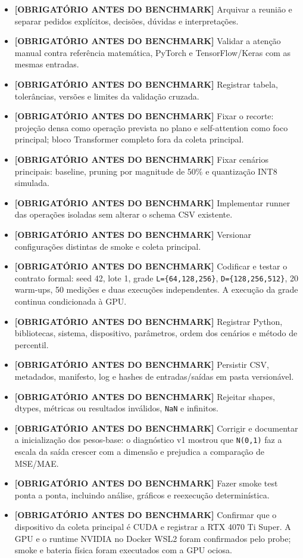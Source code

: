 \begin{itemize}
\item \textbf{[OBRIGATÓRIO ANTES DO BENCHMARK]} Arquivar a reunião e separar pedidos
explícitos, decisões, dúvidas e interpretações.
\item \textbf{[OBRIGATÓRIO ANTES DO BENCHMARK]} Validar a atenção manual contra
referência matemática, PyTorch e TensorFlow/Keras com as mesmas entradas.
\item \textbf{[OBRIGATÓRIO ANTES DO BENCHMARK]} Registrar tabela, tolerâncias,
versões e limites da validação cruzada.
\item \textbf{[OBRIGATÓRIO ANTES DO BENCHMARK]} Fixar o recorte: projeção densa como
operação prevista no plano e self-attention como foco principal; bloco
Transformer completo fora da coleta principal.
\item \textbf{[OBRIGATÓRIO ANTES DO BENCHMARK]} Fixar cenários principais: baseline,
pruning por magnitude de 50\% e quantização INT8 simulada.
\item \textbf{[OBRIGATÓRIO ANTES DO BENCHMARK]} Implementar runner das operações
isoladas sem alterar o schema CSV existente.
\item \textbf{[OBRIGATÓRIO ANTES DO BENCHMARK]} Versionar configurações distintas de
smoke e coleta principal.
\item \textbf{[OBRIGATÓRIO ANTES DO BENCHMARK]} Codificar e testar o contrato formal:
seed 42,
lote 1, grade \texttt{L=\{64,128,256\}}, \texttt{D=\{128,256,512\}}, 20 warm-ups, 50 medições e
duas execuções independentes. A execução da grade continua condicionada à GPU.
\item \textbf{[OBRIGATÓRIO ANTES DO BENCHMARK]} Registrar Python, bibliotecas,
sistema, dispositivo, parâmetros, ordem dos cenários e método de percentil.
\item \textbf{[OBRIGATÓRIO ANTES DO BENCHMARK]} Persistir CSV, metadados, manifesto,
log e hashes de entradas/saídas em pasta versionável.
\item \textbf{[OBRIGATÓRIO ANTES DO BENCHMARK]} Rejeitar shapes, dtypes, métricas ou
resultados inválidos, \texttt{NaN} e infinitos.
\item \textbf{[OBRIGATÓRIO ANTES DO BENCHMARK]} Corrigir e documentar a inicialização
dos pesos-base: o diagnóstico v1 mostrou que \texttt{N(0,1)} faz a escala da saída
crescer com a dimensão e prejudica a comparação de MSE/MAE.
\item \textbf{[OBRIGATÓRIO ANTES DO BENCHMARK]} Fazer smoke test ponta a ponta,
incluindo análise, gráficos e reexecução determinística.
\item \textbf{[OBRIGATÓRIO ANTES DO BENCHMARK]} Confirmar que o dispositivo da coleta
principal é CUDA e registrar a RTX 4070 Ti Super. A GPU e o runtime NVIDIA no
Docker WSL2 foram confirmados pelo probe; smoke e bateria física foram executados
com a GPU ociosa.
\end{itemize}


